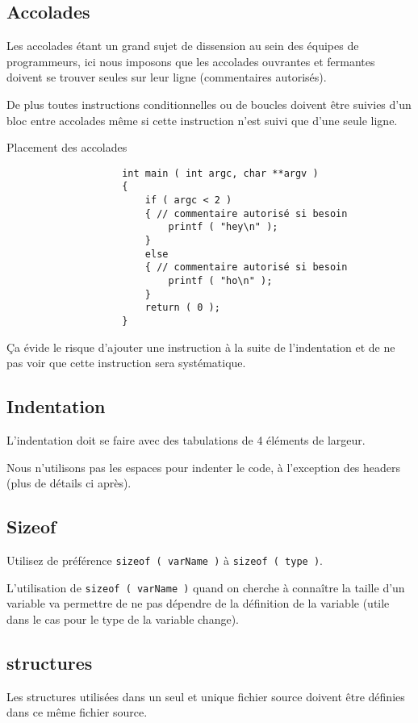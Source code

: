 		\subsection{Accolades}
			Les accolades étant un grand sujet de dissension au sein des équipes de programmeurs, ici nous imposons que les accolades ouvrantes et fermantes doivent se trouver seules sur leur ligne (commentaires autorisés).

			De plus toutes instructions conditionnelles ou de boucles doivent être suivies d'un bloc entre accolades même si cette instruction n'est suivi que d'une seule ligne.

			\begin{cbox}{Placement des accolades}
				\begin{verbatim}
					int main ( int argc, char **argv )
					{
					    if ( argc < 2 )
					    { // commentaire autorisé si besoin
					        printf ( "hey\n" );
					    }
					    else
					    { // commentaire autorisé si besoin
					        printf ( "ho\n" );
					    }
					    return ( 0 );
					}
				\end{verbatim}
			\end{cbox}

			Ça évide le risque d’ajouter une instruction à la suite de l’indentation et de ne pas voir que cette instruction sera systématique.

		\subsection{Indentation}
			L'indentation doit se faire avec des tabulations de 4 éléments de largeur.

			Nous n'utilisons pas les espaces pour indenter le code, à l’exception des headers (plus de détails ci après).

		\subsection{Sizeof}
			Utilisez de préférence \verb+sizeof ( varName )+ à \verb+sizeof ( type )+.

			L'utilisation de \verb+sizeof ( varName )+ quand on cherche à connaître la taille d'un variable va permettre de ne pas dépendre de la définition de la variable (utile dans le cas pour le type de la variable change).

		\subsection{structures}
			Les structures utilisées dans un seul et unique fichier source doivent être définies dans ce même fichier source.


